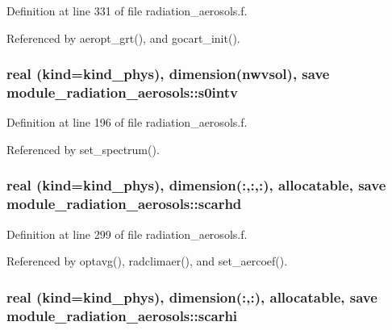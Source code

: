 Definition at line 331 of file radiation\+\_\+aerosols.\+f.



Referenced by aeropt\+\_\+grt(), and gocart\+\_\+init().

\subsubsection[{\texorpdfstring{s0intv}{s0intv}}]{\setlength{\rightskip}{0pt plus 5cm}real (kind=kind\+\_\+phys), dimension({\bf nwvsol}), save module\+\_\+radiation\+\_\+aerosols\+::s0intv\hspace{0.3cm}{\ttfamily [private]}}\hypertarget{namespacemodule__radiation__aerosols_aed8bb8a8bc26d72a6c3d31ed4430941f}{}\label{namespacemodule__radiation__aerosols_aed8bb8a8bc26d72a6c3d31ed4430941f}


Definition at line 196 of file radiation\+\_\+aerosols.\+f.



Referenced by set\+\_\+spectrum().

\subsubsection[{\texorpdfstring{scarhd}{scarhd}}]{\setlength{\rightskip}{0pt plus 5cm}real (kind=kind\+\_\+phys), dimension(\+:,\+:,\+:), allocatable, save module\+\_\+radiation\+\_\+aerosols\+::scarhd\hspace{0.3cm}{\ttfamily [private]}}\hypertarget{namespacemodule__radiation__aerosols_a859ba893a7b0b727ce02f3f29906a0a6}{}\label{namespacemodule__radiation__aerosols_a859ba893a7b0b727ce02f3f29906a0a6}


Definition at line 299 of file radiation\+\_\+aerosols.\+f.



Referenced by optavg(), radclimaer(), and set\+\_\+aercoef().

\subsubsection[{\texorpdfstring{scarhi}{scarhi}}]{\setlength{\rightskip}{0pt plus 5cm}real (kind=kind\+\_\+phys), dimension(\+:,\+:), allocatable, save module\+\_\+radiation\+\_\+aerosols\+::scarhi\hspace{0.3cm}{\ttfamily [private]}}\hypertarget{namespacemodule__radiation__aerosols_a439929b1de549fadecc8537bae13e9de}{}\label{namespacemodule__radiation__aerosols_a439929b1de549fadecc8537bae13e9de}


